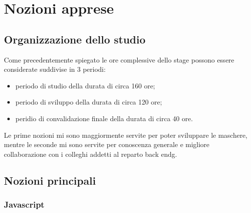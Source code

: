 
\chapter{Nozioni apprese}
\label{cap:nozioni-apprese}


\section{Organizzazione dello studio}
\label{sec:organizzazione-studio}

Come precedentemente spiegato le ore complessive dello stage possono essere considerate suddivise in 3 periodi:
\begin{itemize}
	\item periodo di studio della durata di circa 160 ore;
	\item periodo di sviluppo della durata di circa 120 ore;
	\item peridio di convalidazione finale della durata di circa 40 ore.
\end{itemize}
Le prime nozioni mi sono maggiormente servite per poter sviluppare le maschere, mentre le seconde mi sono servite per conoscenza generale e migliore collaborazione con i colleghi addetti al reparto \gls{back endg}.

\section{Nozioni principali}
\label{sec:nozioni-principali}

\subsection{Javascript}
\label{subsec:javascript}

